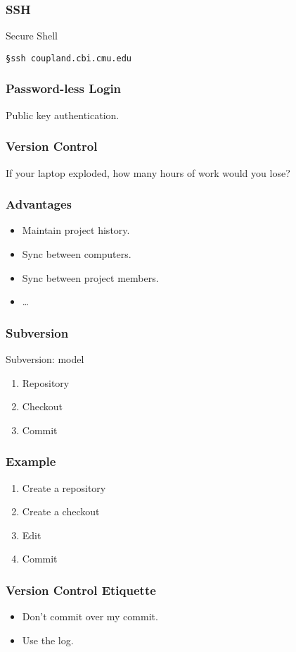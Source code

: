 \begin{frame}[fragile]
\frametitle{SSH}
\begin{block}{Secure Shell}
\begin{verbatim}
§ssh coupland.cbi.cmu.edu
\end{verbatim}
\end{block}
\end{frame}

\begin{frame}[fragile]
\frametitle{Password-less Login}
Public key authentication.
\end{frame}

\begin{frame}[fragile]
\frametitle{Version Control}

If your laptop exploded, how many hours of work would you lose?
\end{frame}

\begin{frame}[fragile]
\frametitle{Advantages}
\begin{itemize}
\item Maintain project history.
\item Sync between computers.
\item Sync between project members.
\item \ldots
\end{itemize}
\end{frame}

\begin{frame}[fragile]
\frametitle{Subversion}
\begin{block}{Subversion: model}
\begin{enumerate}
\item Repository
\item Checkout
\item Commit
\end{enumerate}
\end{block}
\end{frame}

\begin{frame}[fragile]
\frametitle{Example}
\begin{enumerate}
\item Create a repository
\item Create a checkout
\item Edit
\item Commit
\end{enumerate}
\end{frame}

\begin{frame}[fragile]
\frametitle{Version Control Etiquette}
\begin{itemize}
\item Don't commit over my commit.
\item Use the log.
\end{itemize}
\end{frame}


